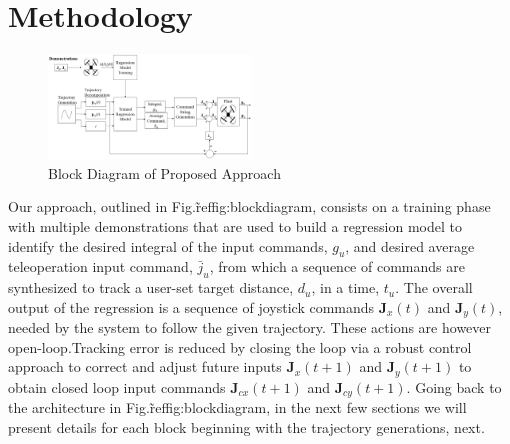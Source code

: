 \documentclass[letterpaper, 10 pt, conference]{ieeeconf}  %
\newcommand\NB[1]{$\spadesuit$\footnote{NB: #1}}
\begin{document}
\section{Methodology} \label{sec:approach}

\begin{figure}[ht]
    \includegraphics[width=0.48\textwidth]{images/blocks.PNG}
    \caption{Block Diagram of Proposed Approach}
    \label{fig:blockdiagram}
\end{figure}

Our approach, outlined in Fig.\~ref{fig:blockdiagram}, consists on a training phase with multiple demonstrations that are used to build a regression model to identify the desired integral of the input commands, $g_u$, and desired average teleoperation input command, $\bar{j}_u$, from which a sequence of commands are synthesized to track a user-set target distance, $d_u$, in a time, $t_u$. The overall output of the regression is a sequence of joystick commands $\mathbf{J}_x(t)$ and $\mathbf{J}_y(t)$, needed by the system to follow the given trajectory. These actions are however open-loop.Tracking error is reduced by closing the loop via a robust control approach to correct and adjust future inputs $\mathbf{J}_x(t+1)$ and $\mathbf{J}_y(t+1)$ to obtain closed loop input commands $\mathbf{J}_{cx}(t+1)$ and $\mathbf{J}_{cy}(t+1)$. 
Going back to the architecture in Fig.\~ref{fig:blockdiagram}, in the next few sections we will present details for each block beginning with the trajectory generations, next.
%
 

\end{document}
